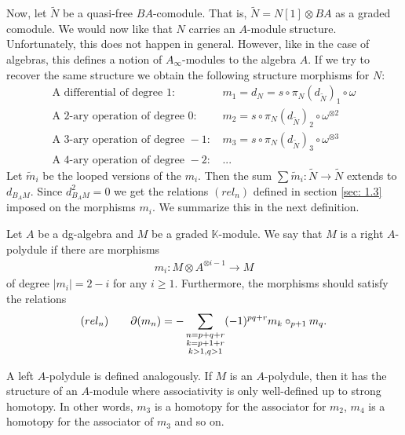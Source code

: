 \documentclass[../thesis.tex]{subfiles}
\begin{document}
            Now, let $\widetilde{N}$ be a quasi-free $BA$-comodule. That is, $\widetilde{N} = N[1] \otimes BA$ as a graded comodule. We would now like that $N$ carries an $A$-module structure. Unfortunately, this does not happen in general. However, like in the case of algebras, this defines a notion of $A_\infty$-modules to the algebra $A$. If we try to recover the same structure we obtain the following structure morphisms for $N$:
            \begin{align*}
                \text{A differential of degree }1\text{: }& m_1 = d_{N} = s\circ \pi_N (d_{\widetilde{N}})_1 \circ \omega\\
                \text{A 2-ary operation of degree }0\text{: }& m_2 = s\circ \pi_N (d_{\widetilde{N}})_2 \circ \omega^{\otimes 2}\\
                \text{A 3-ary operation of degree }-1\text{: }& m_3 = s\circ \pi_N (d_{\widetilde{N}})_3 \circ \omega^{\otimes 3}\\
                \text{A 4-ary operation of degree }-2\text{: }& \text{...}
            \end{align*}
            Let $\widetilde{m}_i$ be the looped versions of the $m_i$. Then the sum $\sum \widetilde{m}_i : \widetilde{N} \rightarrow \widetilde{N}$ extends to $d_{B_AM}$. Since $d_{B_AM}^2 = 0$ we get the relations $(rel_n)$ defined in section \ref{sec: 1.3} imposed on the morphisms $m_i$. We summarize this in the next definition.

            \begin{definition}[$A$-polydule]
                Let $A$ be a dg-algebra and $M$ be a graded $\mathbb{K}$-module. We say that $M$ is a right $A$-polydule if there are morphisms
                \begin{align}
                    m_i : M \otimes A^{\otimes i - 1} \rightarrow M
                \end{align}
                of degree $|m_i| = 2 - i$ for any $i \geq 1$. Furthermore, the morphisms should satisfy the relations
                \begin{align*}
                    (rel_n) \qquad \partial(m_n) = - \sum_{\substack{n = p + q + r \\ k = p + 1 + r \\ k > 1, q > 1}}(-1)^{pq+r}m_k\circ_{p+1}m_q\tt{.}
                \end{align*}
            \end{definition}
            
            A left $A$-polydule is defined analogously. If $M$ is an $A$-polydule, then it has the structure of an $A$-module where associativity is only well-defined up to strong homotopy. In other words, $m_3$ is a homotopy for the associator for $m_2$, $m_4$ is a homotopy for the associator of $m_3$ and so on. 
\end{document}
